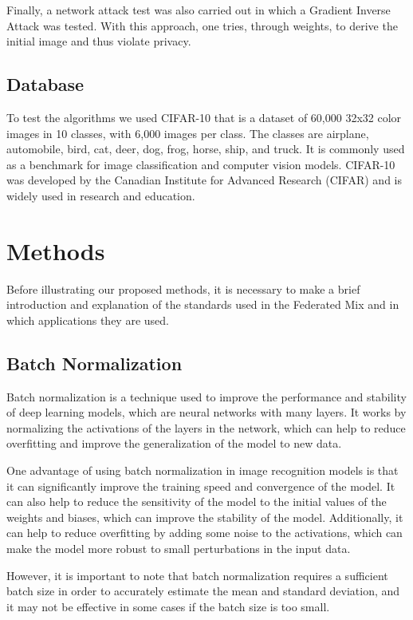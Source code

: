 \documentclass[conference]{IEEEtran}
\begin{document}
Finally, a network attack test was also carried out in which a Gradient Inverse Attack \cite{b7} was tested. With this approach, one tries, through weights, to derive the initial image and thus violate privacy.

\subsection{Database}
To test the algorithms we used CIFAR-10 that is a dataset of 60,000 32x32 color images in 10 classes, with 6,000 images per class. The classes are airplane, automobile, bird, cat, deer, dog, frog, horse, ship, and truck. It is commonly used as a benchmark for image classification and computer vision models. CIFAR-10 was developed by the Canadian Institute for Advanced Research (CIFAR) and is widely used in research and education.

\section{Methods}

Before illustrating our proposed methods, it is necessary to make a brief introduction and explanation of the standards used in the Federated Mix and in which applications they are used.

\subsection{Batch Normalization}

Batch normalization is a technique used to improve the performance and stability of deep learning models, which are neural networks with many layers. It works by normalizing the activations of the layers in the network, which can help to reduce overfitting and improve the generalization of the model to new data.

One advantage of using batch normalization in image recognition models is that it can significantly improve the training speed and convergence of the model. It can also help to reduce the sensitivity of the model to the initial values of the weights and biases, which can improve the stability of the model. Additionally, it can help to reduce overfitting by adding some noise to the activations, which can make the model more robust to small perturbations in the input data.

However, it is important to note that batch normalization requires a sufficient batch size in order to accurately estimate the mean and standard deviation, and it may not be effective in some cases if the batch size is too small.
\end{document}
